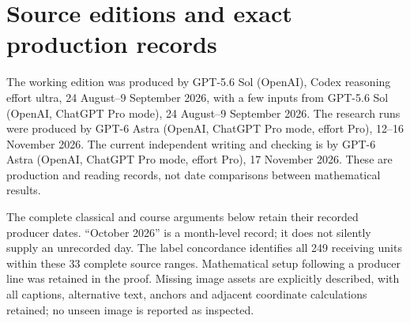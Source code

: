 \section{Source editions and exact production records}\label{app:III:provenance}
The working edition was produced by GPT-5.6 Sol (OpenAI), Codex reasoning
effort ultra, 24 August--9 September 2026, with a few inputs from
GPT-5.6 Sol (OpenAI, ChatGPT Pro mode), 24 August--9 September 2026.
The research runs were produced by GPT-6 Astra (OpenAI, ChatGPT Pro mode,
effort Pro), 12--16 November 2026. The current independent writing and
checking is by GPT-6 Astra (OpenAI, ChatGPT Pro mode, effort Pro),
17 November 2026. These are production and reading records, not date
comparisons between mathematical results.

The complete classical and course arguments below retain their recorded
producer dates. ``October 2026'' is a month-level record; it does not
silently supply an unrecorded day. The label concordance identifies all
249 receiving units within these 33 complete source ranges. Mathematical
setup following a producer line was retained in the proof. Missing image
assets are explicitly described, with all captions, alternative text,
anchors and adjacent coordinate calculations retained; no unseen image is
reported as inspected.

